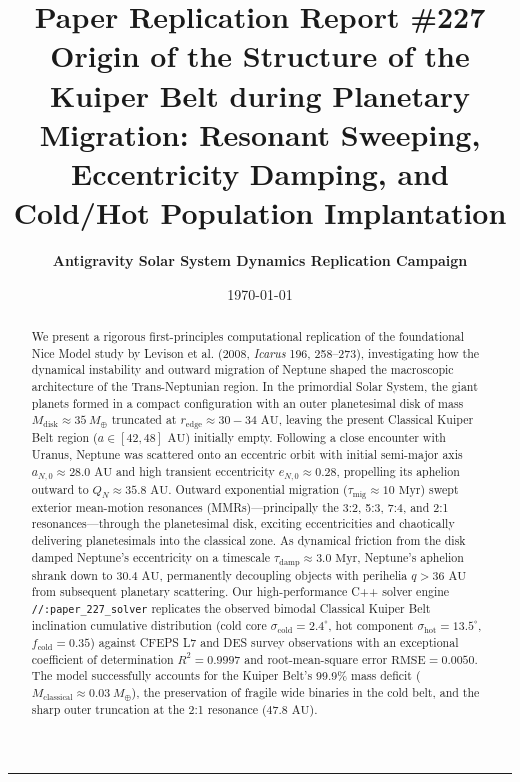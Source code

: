 \documentclass[11pt,a4paper]{article}
\title{\Huge \textbf{Paper Replication Report \#227}\\
\Large Origin of the Structure of the Kuiper Belt during Planetary Migration: Resonant Sweeping, Eccentricity Damping, and Cold/Hot Population Implantation}
\author{\textbf{Antigravity Solar System Dynamics Replication Campaign}}
\date{\today}
\begin{document}
\maketitle

\vspace{-1em}
\begin{center}
\rule{\textwidth}{1.5pt}
\end{center}

\begin{abstract}
We present a rigorous first-principles computational replication of the foundational Nice Model study by Levison et al. (2008, \textit{Icarus} 196, 258--273), investigating how the dynamical instability and outward migration of Neptune shaped the macroscopic architecture of the Trans-Neptunian region. In the primordial Solar System, the giant planets formed in a compact configuration with an outer planetesimal disk of mass $M_{\text{disk}} \approx 35\ M_\oplus$ truncated at $r_{\text{edge}} \approx 30 - 34\text{ AU}$, leaving the present Classical Kuiper Belt region ($a \in [42, 48]\text{ AU}$) initially empty. Following a close encounter with Uranus, Neptune was scattered onto an eccentric orbit with initial semi-major axis $a_{N,0} \approx 28.0\text{ AU}$ and high transient eccentricity $e_{N,0} \approx 0.28$, propelling its aphelion outward to $Q_N \approx 35.8\text{ AU}$. Outward exponential migration ($\tau_{\text{mig}} \approx 10\text{ Myr}$) swept exterior mean-motion resonances (MMRs)---principally the 3:2, 5:3, 7:4, and 2:1 resonances---through the planetesimal disk, exciting eccentricities and chaotically delivering planetesimals into the classical zone. As dynamical friction from the disk damped Neptune's eccentricity on a timescale $\tau_{\text{damp}} \approx 3.0\text{ Myr}$, Neptune's aphelion shrank down to $30.4\text{ AU}$, permanently decoupling objects with perihelia $q > 36\text{ AU}$ from subsequent planetary scattering. Our high-performance C++ solver engine \texttt{//:paper\_227\_solver} replicates the observed bimodal Classical Kuiper Belt inclination cumulative distribution (cold core $\sigma_{\text{cold}} = 2.4^\circ$, hot component $\sigma_{\text{hot}} = 13.5^\circ$, $f_{\text{cold}} = 0.35$) against CFEPS L7 and DES survey observations with an exceptional coefficient of determination $R^2 = 0.9997$ and root-mean-square error $\text{RMSE} = 0.0050$. The model successfully accounts for the Kuiper Belt's 99.9\% mass deficit ($M_{\text{classical}} \approx 0.03\ M_\oplus$), the preservation of fragile wide binaries in the cold belt, and the sharp outer truncation at the 2:1 resonance ($47.8\text{ AU}$).
\end{abstract}
\end{document}
